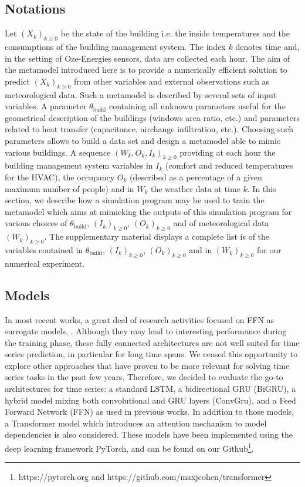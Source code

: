 \documentclass[12pt]{article}
\begin{document}
\subsection{Notations}
Let $(X_k)_{k\geqslant 0}$ be the state of the building i.e. the inside temperatures and the consumptions of the building management system. The index $k$ denotes time and, in the setting of Oze-Energies sensors, data are collected each hour. The aim of the metamodel introduced here is to provide a numerically efficient solution to predict $(X_k)_{k\geqslant 0}$ from other variables and external observations such as meteorological data. Such a metamodel is described by several sets of input variables. A parameter $\theta_{\mathrm{build}}$ containing all unknown parameters useful for the geometrical description of the buildings (windows area ratio, etc.) and parameters related to heat transfer  (capacitance, airchange infiltration, etc.). Choosing such parameters allows to build a data set and design a metamodel able to mimic various buildings.%
A sequence $(W_k,O_k,I_k)_{k\geqslant 0}$ providing at each hour the building management system variables in $I_k$ (comfort and reduced temperatures for the HVAC), the occupancy $O_k$ (described as a percentage of a given maximum number of people) and in $W_k$ the weather data at time $k$. In this section, we describe how a simulation program may be used to train the metamodel which aims at mimicking the outputs of this simulation program for  various choices of $\theta_{\mathrm{build}}$, $(I_k)_{k\geqslant 0}$, $(O_k)_{k\geqslant 0}$ and of meteorological data $(W_k)_{k\geqslant 0}$. The supplementary material displays a complete list is of the variables contained in $\theta_{\mathrm{build}}$, $(I_k)_{k\geqslant 0}$, $(O_k)_{k\geqslant 0}$ and in $(W_k)_{k\geqslant 0}$ for our numerical experiment.

\subsection{Models}
In most recent works, a great deal of research activities focused on FFN as surrogate models, \cite{Bre2020AnEM,Magnier2010MultiobjectiveOO, Reynolds2018AZB}. Although they may lead to interesting performance during the training phase, these fully connected architectures are not well suited for time series prediction, in particular for long time spans. We ceased this opportunity to explore other approaches that have proven to be more relevant for solving time series tasks in the past few years. Therefore, we decided to evaluate the go-to architectures for time series: a standard LSTM, a bidirectional GRU (BiGRU), a hybrid model mixing both convolutional and GRU layers (ConvGru), and a Feed Forward Network (FFN) as used in previous works.  In addition to those models, a Transformer model which  introduces an attention mechanism to model dependencies is also considered. These models have been implemented using the deep learning framework PyTorch, and can be found on our Github\footnote{https://pytorch.org and https://github.com/maxjcohen/transformer}.
\end{document}
